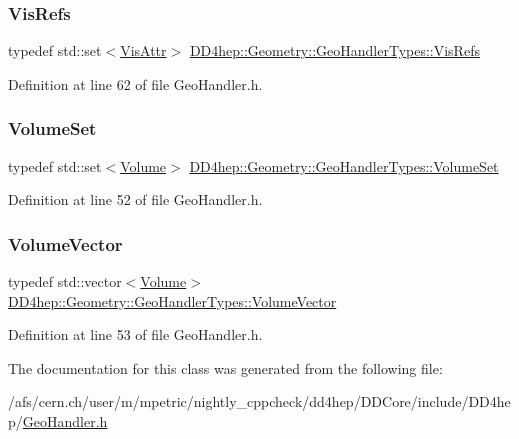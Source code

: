 \subsubsection{\texorpdfstring{Vis\+Refs}{VisRefs}}
{\footnotesize\ttfamily typedef std\+::set$<$\hyperlink{class_d_d4hep_1_1_geometry_1_1_vis_attr}{Vis\+Attr}$>$ \hyperlink{class_d_d4hep_1_1_geometry_1_1_geo_handler_types_abeb370eb52c06e48c61e6c8bc19b66ab}{D\+D4hep\+::\+Geometry\+::\+Geo\+Handler\+Types\+::\+Vis\+Refs}}



Definition at line 62 of file Geo\+Handler.\+h.

\hypertarget{class_d_d4hep_1_1_geometry_1_1_geo_handler_types_a87ea3b22bdfe08f1a4afca3d58fd8ca0}{}\label{class_d_d4hep_1_1_geometry_1_1_geo_handler_types_a87ea3b22bdfe08f1a4afca3d58fd8ca0} 
\subsubsection{\texorpdfstring{Volume\+Set}{VolumeSet}}
{\footnotesize\ttfamily typedef std\+::set$<$\hyperlink{class_d_d4hep_1_1_geometry_1_1_volume}{Volume}$>$ \hyperlink{class_d_d4hep_1_1_geometry_1_1_geo_handler_types_a87ea3b22bdfe08f1a4afca3d58fd8ca0}{D\+D4hep\+::\+Geometry\+::\+Geo\+Handler\+Types\+::\+Volume\+Set}}



Definition at line 52 of file Geo\+Handler.\+h.

\hypertarget{class_d_d4hep_1_1_geometry_1_1_geo_handler_types_a6713619ef278692ebdf9f6ee4a3f32de}{}\label{class_d_d4hep_1_1_geometry_1_1_geo_handler_types_a6713619ef278692ebdf9f6ee4a3f32de} 
\subsubsection{\texorpdfstring{Volume\+Vector}{VolumeVector}}
{\footnotesize\ttfamily typedef std\+::vector$<$\hyperlink{class_d_d4hep_1_1_geometry_1_1_volume}{Volume}$>$ \hyperlink{class_d_d4hep_1_1_geometry_1_1_geo_handler_types_a6713619ef278692ebdf9f6ee4a3f32de}{D\+D4hep\+::\+Geometry\+::\+Geo\+Handler\+Types\+::\+Volume\+Vector}}



Definition at line 53 of file Geo\+Handler.\+h.



The documentation for this class was generated from the following file\+:\begin{DoxyCompactItemize}
\item 
/afs/cern.\+ch/user/m/mpetric/nightly\+\_\+cppcheck/dd4hep/\+D\+D\+Core/include/\+D\+D4hep/\hyperlink{_geo_handler_8h}{Geo\+Handler.\+h}\end{DoxyCompactItemize}
